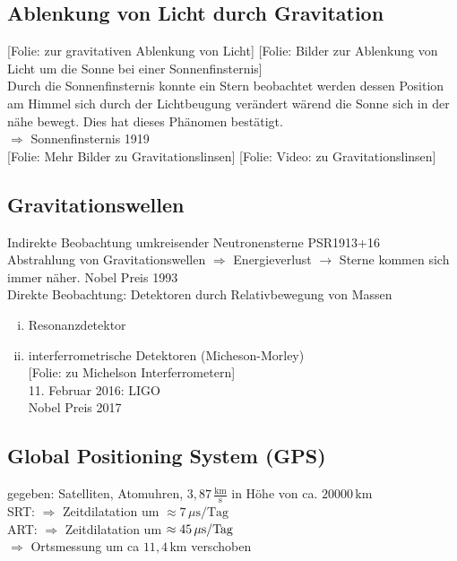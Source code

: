 \documentclass[titlepage,11pt,a4paper,ngerman]{report}
\newcommand{\tx}[1]{\textrm{#1}}
\newcommand{\folie}[1]{\color{gray}[Folie: #1]\color{black}}
\newcommand{\lcom}[1]{\color{MidnightBlue}#1\color{black}}
\begin{document}
\subsection{Ablenkung von Licht durch Gravitation}
\folie{zur gravitativen Ablenkung von Licht} \folie{Bilder zur Ablenkung von Licht um die Sonne bei einer Sonnenfinsternis}\\
\lcom{Durch die Sonnenfinsternis konnte ein Stern beobachtet werden dessen Position am Himmel sich durch der Lichtbeugung verändert wärend die Sonne sich in der nähe bewegt. Dies hat dieses Phänomen bestätigt.}\\
$ \Rightarrow $ Sonnenfinsternis 1919\\
\folie{Mehr Bilder zu Gravitationslinsen} \folie{Video: zu Gravitationslinsen}

\subsection{Gravitationswellen}
Indirekte Beobachtung umkreisender Neutronensterne PSR1913+16\\
Abstrahlung von Gravitationswellen $ \Rightarrow $ Energieverlust $ \rightarrow $ Sterne kommen sich immer näher. Nobel Preis 1993\\[5pt]
Direkte Beobachtung: Detektoren durch Relativbewegung von Massen
\begin{enumerate}[(i)]
	\item Resonanzdetektor
	\item interferrometrische Detektoren (Micheson-Morley)\\
	\folie{zu Michelson Interferrometern}\\
	11. Februar 2016: LIGO\\
	Nobel Preis 2017
\end{enumerate}

\subsection{Global Positioning System (GPS)}
gegeben: Satelliten, Atomuhren, $ 3{,}87 \, \frac{\tx{km}}{\tx{s}} $ in Höhe von ca. $ 20000 \, \tx{km} $\\[5pt]
SRT: $ \Rightarrow $ Zeitdilatation um $ \approx 7 \, \mu \tx{s} / \tx{Tag} $\\
ART: $ \Rightarrow $ Zeitdilatation um $ \approx 45 \, \mu \tx{s/\tx{Tag}} $\\[5pt]
$ \Rightarrow $ Ortsmessung um ca $ 11{,}4 \, \tx{km} $ verschoben
\end{document}
